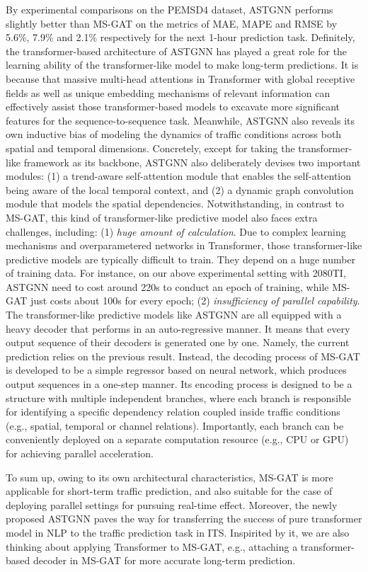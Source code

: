By experimental comparisons on the PEMSD4 dataset, ASTGNN performs slightly better than MS-GAT on the metrics of MAE, MAPE and RMSE by 5.6\%, 7.9\% and 2.1\% respectively for the next 1-hour prediction task. Definitely, the transformer-based architecture of ASTGNN has played a great role for the learning ability of the transformer-like model to make long-term predictions. It is because that massive multi-head attentions in Transformer with global receptive fields as well as unique embedding mechanisms of relevant information can effectively assist those transformer-based models to excavate more significant features for the sequence-to-sequence task. Meanwhile, ASTGNN also reveals its own inductive bias of modeling the dynamics of traffic conditions across both spatial and temporal dimensions. Concretely, except for taking the transformer-like framework as its backbone, ASTGNN also deliberately devises two important modules: (1) a trend-aware self-attention module that enables the self-attention being aware of the local temporal context, and (2) a dynamic graph convolution module that models the spatial dependencies. Notwithstanding, in contrast to MS-GAT, this kind of transformer-like predictive model also faces extra challenges, including: (1) \textit{huge amount of calculation}. Due to complex learning mechanisms and overparametered networks in Transformer, those transformer-like predictive models are typically difficult to train. They depend on a huge number of training data. For instance, on our above experimental setting with 2080TI, ASTGNN need to cost around 220s to conduct an epoch of training, while MS-GAT just costs about 100s for every epoch; (2) \textit{insufficiency of parallel capability}. The transformer-like predictive models like ASTGNN are all equipped with a heavy decoder that performs in an auto-regressive manner. It means that every output sequence of their decoders is generated one by one. Namely, the current prediction relies on the previous result. Instead, the decoding process of MS-GAT is developed to be a simple regressor based on neural network, which produces output sequences in a one-step manner. Its encoding process is designed to be a structure with multiple independent branches, where each branch is responsible for identifying a specific dependency relation coupled inside traffic conditions (e.g., spatial, temporal or channel relations). Importantly, each branch can be conveniently deployed on a separate computation resource (e.g., CPU or GPU) for achieving parallel acceleration. 

To sum up, owing to its own architectural characteristics, MS-GAT is more applicable for short-term traffic prediction, and also suitable for the case of deploying parallel settings for pursuing real-time effect. Moreover, the newly proposed ASTGNN paves the way for transferring the success of pure transformer model in NLP to the traffic prediction task in ITS. Inspirited by it, we are also thinking about applying Transformer to MS-GAT, e.g., attaching a transformer-based decoder in MS-GAT for more accurate long-term prediction. 
